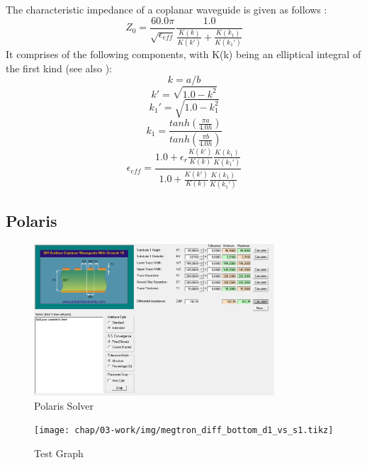     
  The characteristic impedance of a coplanar waveguide is given as follows \cite{wadell}: 
  \begin{equation}
  Z_0 = \frac{60.0 \pi}{\sqrt{\epsilon_{eff}}} \frac{1.0}{\frac{K(k)}{K(k')} + \frac{K(k_1)}{K(k_1')}}
  \end{equation}
  It comprises of the following components, with K(k) being an elliptical integral of the first kind (see also \cite[p.~430]{bronstein}):
  \begin{equation}
  k = a/b
  \end{equation}
  \begin{equation}
  k' = \sqrt{1.0 - k^{2}}
  \end{equation}
  \begin{equation}
  k_1' = \sqrt{1.0 - k_1^{2}}
  \end{equation}
  \begin{equation}
  k_1 = \frac{tanh(\frac{\pi a}{4.0  h})}{tanh(\frac{\pi  b}{4.0 h})}
  \end{equation}
  \begin{equation}
  \epsilon_{eff} = \frac{1.0 + \epsilon_r \frac{K(k')}{K(k)} \frac{K(k_1)}{K(k_1')}}{1.0 + \frac{K(k')}{K(k)} \frac{K(k_1)}{K(k_1')}}
  \end{equation}
  
\subsection{Polaris}


\begin{figure}[H]
	\centering
	\includegraphics[width = 0.8\textwidth]{chap/03-work/img/polaris.png}
	\caption{Polaris Solver}
	\label{fig:polaris}
\end{figure}

\begin{figure}[H]
	\centering
	\texttt{[image: chap/03-work/img/megtron\_diff\_bottom\_d1\_vs\_s1.tikz]}
	\caption{Test Graph}
	\label{fig:megtron}
\end{figure}

